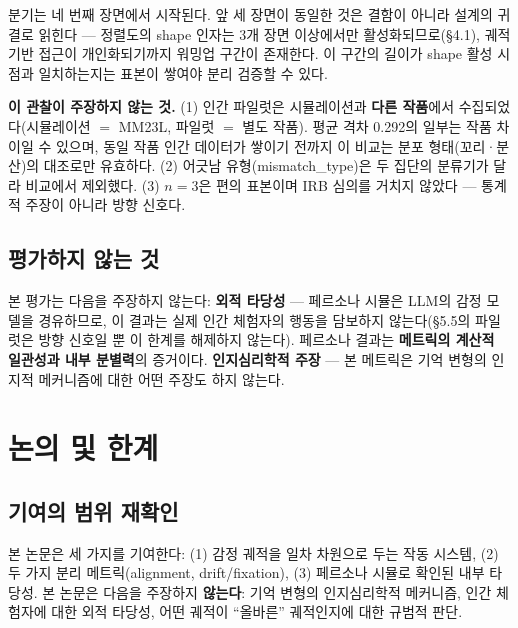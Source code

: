 \documentclass[11pt, a4paper]{article}
\begin{document}
분기는 네 번째 장면에서 시작된다. 앞 세 장면이 동일한 것은 결함이 아니라 설계의 귀결로 읽힌다 --- 정렬도의 shape 인자는 3개 장면 이상에서만 활성화되므로(\S4.1), 궤적 기반 접근이 개인화되기까지 워밍업 구간이 존재한다. 이 구간의 길이가 shape 활성 시점과 일치하는지는 표본이 쌓여야 분리 검증할 수 있다.

\textbf{이 관찰이 주장하지 않는 것.} (1) 인간 파일럿은 시뮬레이션과 \textbf{다른 작품}에서 수집되었다(시뮬레이션 $=$ MM23L, 파일럿 $=$ 별도 작품). 평균 격차 0.292의 일부는 작품 차이일 수 있으며, 동일 작품 인간 데이터가 쌓이기 전까지 이 비교는 분포 형태(꼬리·분산)의 대조로만 유효하다. (2) 어긋남 유형(mismatch\_type)은 두 집단의 분류기가 달라 비교에서 제외했다. (3) $n=3$은 편의 표본이며 IRB 심의를 거치지 않았다 --- 통계적 주장이 아니라 방향 신호다.

\subsection{평가하지 않는 것}
본 평가는 다음을 주장하지 않는다: \textbf{외적 타당성} --- 페르소나 시뮬은 LLM의 감정 모델을 경유하므로, 이 결과는 실제 인간 체험자의 행동을 담보하지 않는다(\S5.5의 파일럿은 방향 신호일 뿐 이 한계를 해제하지 않는다). 페르소나 결과는 \textbf{메트릭의 계산적 일관성과 내부 분별력}의 증거이다. \textbf{인지심리학적 주장} --- 본 메트릭은 기억 변형의 인지적 메커니즘에 대한 어떤 주장도 하지 않는다.

\section{논의 및 한계}

\subsection{기여의 범위 재확인}
본 논문은 세 가지를 기여한다: (1) 감정 궤적을 일차 차원으로 두는 작동 시스템, (2) 두 가지 분리 메트릭(alignment, drift/fixation), (3) 페르소나 시뮬로 확인된 내부 타당성. 본 논문은 다음을 주장하지 \textbf{않는다}: 기억 변형의 인지심리학적 메커니즘, 인간 체험자에 대한 외적 타당성, 어떤 궤적이 ``올바른'' 궤적인지에 대한 규범적 판단.
\end{document}
